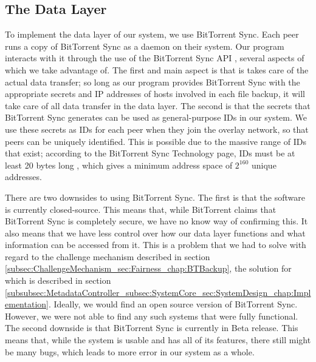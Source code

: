 \documentclass[12pt]{report}
\begin{document}
\subsection{The Data Layer}
To implement the data layer of our system, we use BitTorrent Sync. Each peer runs a copy of BitTorrent Sync as a daemon on their system. Our program interacts with it through the use of the BitTorrent Sync API \cite{btsyncapi}, several aspects of which we take advantage of. The first and main aspect is that is takes care of the actual data transfer; so long as our program provides BitTorrent Sync with the appropriate secrets and IP addresses of hosts involved in each file backup, it will take care of all data transfer in the data layer. The second is that the secrets that BitTorrent Sync generates can be used as general-purpose IDs in our system. We use these secrets as IDs for each peer when they join the overlay network, so that peers can be uniquely identified. This is possible due to the massive range of IDs that exist; according to the BitTorrent Sync Technology page, IDs must be at least 20 bytes long \cite{btsynctech}, which gives a minimum address space of $2^{160}$ unique addresses.

There are two downsides to using BitTorrent Sync. The first is that the software is currently closed-source. This means that, while BitTorrent claims that BitTorrent Sync is completely secure, we have no know way of confirming this. It also means that we have less control over how our data layer functions and what information can be accessed from it. This is a problem that we had to solve with regard to the challenge mechanism described in section \ref{subsec:ChallengeMechanism_sec:Fairness_chap:BTBackup}, the solution for which is described in section \ref{subsubsec:MetadataController_subsec:SystemCore_sec:SystemDesign_chap:Implementation}. Ideally, we would find an open source version of BitTorrent Sync. However, we were not able to find any such systems that were fully functional. The second downside is that BitTorrent Sync is currently in Beta release. This means that, while the system is usable and has all of its features, there still might be many bugs, which leads to more error in our system as a whole.
\end{document}
